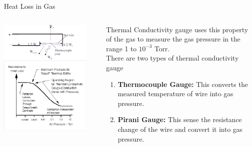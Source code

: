 \documentclass[11pt]{beamer}
\begin{document}
\begin{frame}{Heat Loss in Gas}

\begin{columns}[t]
    
      
       \begin{exampleblock}{}
         		\begin{center}
						\includegraphics[width=0.9\textwidth]{HeatLossInGas.png}
				\end{center}
       \end{exampleblock}
       
       \begin{exampleblock}{ }
          Thermal Conductivity gauge uses this property of the gas to measure the gas pressure in the range 1 to $10^{-3}$ Torr.\\
          There are two types of thermal conductivity gauge 
           \begin{enumerate}
           \item \textbf{Thermocouple Gauge:} This converts the measured temperature of wire into gas pressure.
           \item  \textbf{Pirani Gauge:} This sense the resistance change of the wire and convert it into gas pressure.
           \end{enumerate}
           
       
       \end{exampleblock}   
   
    \end{columns}   




\end{frame}
\end{document}
